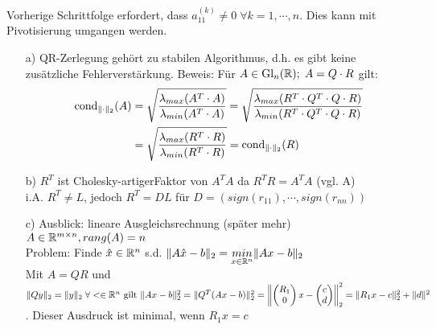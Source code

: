 \begin{Bemerkung}
	Vorherige Schrittfolge erfordert, dass $a_{11}^{(k)} \neq 0 \;\forall k=1,\cdots,n$.
	Dies kann mit Pivotisierung umgangen werden. 
\end{Bemerkung}\hfill
\begin{weitere Bemerkungen}\hfill
	\begin{itemize}
		\item[a)]QR-Zerlegung gehört zu \glqq stabilen Algorithmus\grqq, d.h. es gibt keine zusätzliche Fehlerverstärkung.
Beweis: Für $A \in \mathrm{Gl}_n(\mathbb R); \; A = Q \cdot R$ gilt:
\begin{align*}
  \mathrm{cond}_{\| \cdot \|_2}(A) &= \sqrt{\frac{\lambda_{max}(A^T \cdot A)}{\lambda_{min}(A^T \cdot A)}} =
\sqrt{\frac{\lambda_{max}(R^T \cdot Q^T \cdot Q \cdot R)}{\lambda_{min}(R^T \cdot Q^T \cdot Q \cdot R)}} \\
&= \sqrt{\frac{\lambda_{max}(R^T \cdot R)}{\lambda_{min}(R^T \cdot R)}} = \mathrm{cond}_{\| \cdot \|_2}(R)
\end{align*}
		\item[b)]$R^T$ ist \glqq Cholesky-artiger\grqq Faktor von $A^TA$ da $R^TR=A^TA$ (vgl. A)\\ i.A. $R^T \neq L$, jedoch $R^T=DL$ für $D=(sign(r_{11}),\cdots,sign(r_{nn}))$
		\item[c)]Ausblick: lineare Ausgleichsrechnung (später mehr)\\
		$A \in\mathbb R^{m\times n}, rang(A)=n$\\
		Problem: Finde $\hat{x} \in \mathbb R^n$ s.d. $\|A\hat{x}-b\|_2=\underset{x\in\mathbb R^n}{min}\|Ax-b\|_2$\\
		Mit $A=QR$ und $\|Qy\|_2=\|y\|_2 \;\forall < \in \mathbb R^n \text{ gilt }\\
      \|Ax-b\|_2^2=\|Q^T(Ax-b)\|_2^2=\left\|\begin{pmatrix}R_1\\0\end{pmatrix}x-\begin{pmatrix}c\\d\end{pmatrix}\right\|_2^2 = \|R_1x-c\|_2^2 + \|d\|^2$. Dieser Ausdruck ist minimal, wenn $R_1x=c$
	\end{itemize}
\end{weitere Bemerkungen}